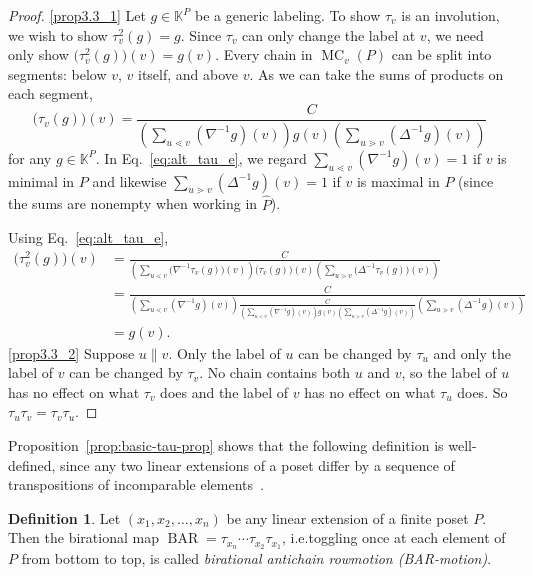 \documentclass[10pt]{amsart}
\theoremstyle{definition}
\newtheorem{defi}[theo]{Definition}
\newcommand{\ie}{i.e.}
\newcommand{\defn}[1]{\emph{#1}}
\newcommand{\kk}{\mathbb{K}}
\newcommand{\down}{\nabla}
\newcommand{\up}{\Delta}
\DeclareMathOperator{\mc}{MC}
\DeclareMathOperator{\BAR}{BAR}
\begin{document}
\begin{proof}
\ref{prop3.3_1}
Let $g\in \kk^P$ be a generic labeling.
To show $\tau_v$ is an involution, we wish to show
$\tau_v^2(g)=g$.
Since $\tau_v$ can only change the label at $v$, we need only show
$\big(\tau_v^2(g)\big)(v)=g(v)$.
Every chain in $\mc_v(P)$ can be split into segments: below $v$, $v$ itself, and above $v$. As we can take the sums of products on each segment,
\begin{equation}\label{eq:alt_tau_e}
\big(\tau_v(g)\big)(v) =
\frac{C}{\left(\sum\limits_{u\lessdot v}
(\down^{-1}g)(v)\right) g(v) \left(\sum\limits_{u\gtrdot v}
(\up^{-1}g)(v)\right)}
\end{equation}
for any $g\in\kk^P$.
In Eq.~\eqref{eq:alt_tau_e}, we regard
$\sum\limits_{u\lessdot v}
(\down^{-1}g)(v)=1$ if $v$ is minimal in $P$ and likewise $\sum\limits_{u\gtrdot v}
(\up^{-1}g)(v)=1$ if $v$ is maximal in $P$
(since the sums are nonempty when working in $\widehat{P}$).

Using Eq.~\eqref{eq:alt_tau_e},
\begin{align*}
 \big(\tau_v^2(g)\big)(v) &=
 \frac{C}{\left(\sum\limits_{u\lessdot v}
\big(\down^{-1}\tau_v(g)\big)(v)\right) \big(\tau_v(g)\big)(v) \left(\sum\limits_{u\gtrdot v}
\big(\up^{-1}\tau_v(g)\big)(v)\right)}\\
&=\frac{C}{\left(\sum\limits_{u\lessdot v}
(\down^{-1}g)(v)\right) \frac{C}{\left(\sum\limits_{u\lessdot v}
(\down^{-1}g)(v)\right) g(v) \left(\sum\limits_{u\gtrdot v}
(\up^{-1}g)(v)\right)} \left(\sum\limits_{u\gtrdot v}
(\up^{-1}g)(v)\right)}\\
&=g(v).
\end{align*}
\ref{prop3.3_2} %
Suppose $u \parallel v$.
Only the label of $u$ can be changed by $\tau_u$ and only the label of $v$ can be changed by $\tau_v$.
No chain contains both $u$ and $v$, so the label of $u$ has no effect on what $\tau_v$ does and the label of $v$ has no effect on what $\tau_u$ does. So $\tau_u\tau_v=\tau_v\tau_u$.
\end{proof}

Proposition~\ref{prop:basic-tau-prop}
shows that the following definition is
well-defined, since any two linear extensions of a
poset differ by a sequence of transpositions of incomparable elements~\cite{etienne-84}.

\begin{defi}\label{def:BAR}
Let $(x_1,x_2,\dots,x_n)$ be any linear extension of a finite poset $P$. Then the birational
map $\BAR=\tau_{x_n}\cdots \tau_{x_2} \tau_{x_1}$, \ie toggling once at each element of $P$
from bottom to top, is called \defn{birational antichain rowmotion (BAR-motion)}.
\end{defi}
\end{document}
